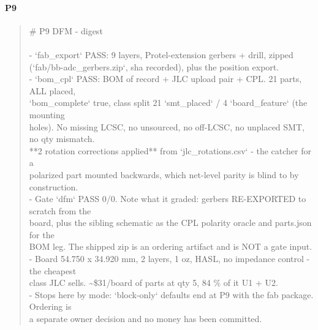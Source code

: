 \documentclass[11pt,a4paper]{article}
\begin{document}
\paragraph*{P9}
\begin{quote}\small\ttfamily\raggedright
\# P9 DFM - digest\\
~\\
- `fab\_export` PASS: 9 layers, Protel-extension gerbers + drill, zipped\\
  (`fab/bb-adc\_gerbers.zip`, sha recorded), plus the position export.\\
- `bom\_cpl` PASS: BOM of record + JLC upload pair + CPL. 21 parts, ALL placed,\\
  `bom\_complete` true, class split 21 `smt\_placed` / 4 `board\_feature` (the mounting\\
  holes). No missing LCSC, no unsourced, no off-LCSC, no unplaced SMT, no qty mismatch.\\
  {*}{*}2 rotation corrections applied{*}{*} from `jlc\_rotations.csv` - the catcher for a\\
  polarized part mounted backwards, which net-level parity is blind to by construction.\\
- Gate `dfm` PASS 0/0. Note what it graded: gerbers RE-EXPORTED to scratch from the\\
  board, plus the sibling schematic as the CPL polarity oracle and parts.json for the\\
  BOM leg. The shipped zip is an ordering artifact and is NOT a gate input.\\
- Board 54.750 x 34.920 mm, 2 layers, 1 oz, HASL, no impedance control - the cheapest\\
  class JLC sells. \textasciitilde{}\$31/board of parts at qty 5, 84 \% of it U1 + U2.\\
- Stops here by mode: `block-only` defaults end at P9 with the fab package. Ordering is\\
  a separate owner decision and no money has been committed.
\end{quote}
\end{document}
